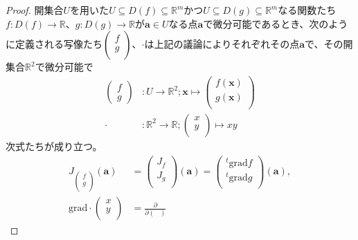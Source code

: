 \documentclass[dvipdfmx]{jsarticle}
\begin{document}
\begin{proof}
開集合$U$を用いた$U \subseteq D(f) \subseteq \mathbb{R}^{m}$かつ$U \subseteq D(g) \subseteq \mathbb{R}^{m}$なる関数たち$f:D(f) \rightarrow \mathbb{R}$、$g:D(g) \rightarrow \mathbb{R}$が$\mathbf{a} \in U$なる点$\mathbf{a}$で微分可能であるとき、次のように定義される写像たち$\begin{pmatrix}
f \\
g \\
\end{pmatrix}$、$\cdot$は上記の議論によりそれぞれその点$\mathbf{a}$で、その開集合$\mathbb{R}^{2}$で微分可能で
\begin{align*}
\begin{pmatrix}
f \\
g 
\end{pmatrix}&:U \rightarrow \mathbb{R}^{2};\mathbf{x} \mapsto \begin{pmatrix}
f\left( \mathbf{x} \right) \\
g\left( \mathbf{x} \right) \\
\end{pmatrix}\\
\cdot &:\mathbb{R}^{2} \rightarrow \mathbb{R};\begin{pmatrix}
x \\
y \\
\end{pmatrix} \mapsto xy
\end{align*}
次式たちが成り立つ。
\begin{align*}
J_{\begin{pmatrix}
f \\
g \\
\end{pmatrix}}\left( \mathbf{a} \right) &= \begin{pmatrix}
J_{f} \\
J_{g} \\
\end{pmatrix}\left( \mathbf{a} \right) = \begin{pmatrix}
{}^{t}\mathrm{grad}f \\
{}^{t}\mathrm{grad}g \\
\end{pmatrix}\left( \mathbf{a} \right),\\
\mathrm{grad} \cdot \begin{pmatrix}
x \\
y \\
\end{pmatrix} &= \frac{\partial}{\partial\begin{pmatrix}

\end{pmatrix}}
\end{align*}
\end{proof}
\end{document}
